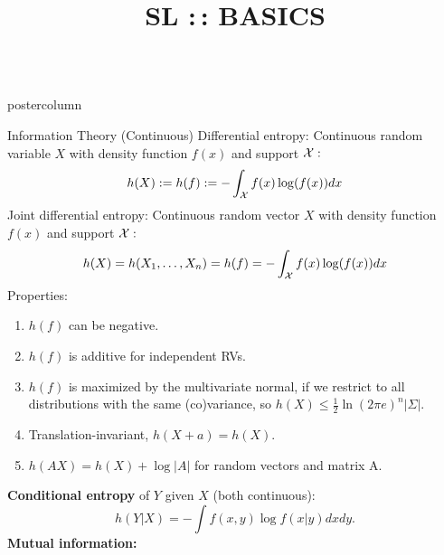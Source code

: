 \documentclass{beamer}
\title{SL :\,: BASICS} %
\newlength{\columnheight} %
\begin{document}
	\begin{frame}[fragile]{}
	\vspace{-8ex}
		\begin{columns}
			\begin{column}{.31\textwidth}
				\begin{beamercolorbox}[center]{postercolumn}
					\begin{minipage}{.98\textwidth}
						\parbox[t][\columnheight]{\textwidth}{
							\begin{myblock}{Information Theory (Continuous)}
								Differential entropy: Continuous random variable $X$ with density function $f(x)$ and support $\mathcal{X}:$
									$$ h(X) := h(f) := - \int_{\mathcal{X}} f(x) \log(f(x)) dx $$
								Joint differential entropy: Continuous random vector $X$ with density function $f(x)$ and support $\mathcal{X}:$
									$$ h(X) = h(X_1, \ldots, X_n) = h(f) = - \int_{\mathcal{X}} f(x) \log(f(x)) dx $$
								Properties:
								\begin{enumerate}
									\setlength{\itemindent}{+.3in}
								\item $h(f)$ can be negative.
								\item $h(f)$ is additive for independent RVs.
								\item $h(f)$ is maximized by the multivariate normal, if we restrict 
								to all distributions with the same (co)variance, so
								$h(X) \leq \frac{1}{2} \ln(2 \pi e)^n |\Sigma|.$
								\item Translation-invariant, $ h(X+a) = h(X)$. 
								\item $h(AX) = h(X) + \log |A|$ for random vectors and matrix A.
								\end{enumerate}
								\textbf{Conditional entropy} of $Y$ given $X$ (both continuous):
								$$h(Y|X) = - \int f(x,y) \log f(x|y) dx dy.$$
								\textbf{Mutual information:}
								\begin{equation*}\begin{aligned}

\end{aligned}
\end{equation*}
\end{myblock}}
\end{minipage}
\end{beamercolorbox}
\end{column}
\end{columns}
\end{frame}
\end{document}
